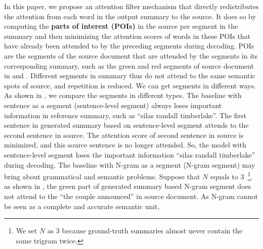 In this paper, we propose an attention filter mechanism that directly 
redistributes the attention from each word in the output summary to the source. 
It does so by computing the \textbf{parts of interest (POIs)} 
in the source per segment in the summary
and then minimizing the attention scores of
words in these POIs that have already been attended to by the preceding 
segments during decoding. 
POIs are the segments of the source document that are attended by the segments in its corresponding summary, 
such as the green and red segments of source document in  and .
Different segments in summary thus do not attend to the same semantic spots
of source, and repetition is reduced. 
We can get segments in different ways.
As shown in , we compare the segments in different types.
The baseline with sentence as a segment (sentence-level segment) 
always loses important information in reference summary, such as ``silas randall timberlake''.
The first sentence in generated summary based on sentence-level segment attends to 
the second sentence in source. 
The attention score of second sentence in source is minimized,
and this source sentence is no longer attended. 
So, the model with sentence-level segment loses the important information ``silas randall timberlake''
during decoding.
The baseline with N-gram as a segment (N-gram segment) may bring about grammatical and semantic problems.
Suppose that $N$ equals to 3~\footnote{We set $N$ as 3 because ground-truth summaries almost never contain the same trigram twice.}, 
as shown in ,
the green part of generated summary based N-gram segment does not attend to the ``the couple announced''
in source document. 
As N-gram cannot be seen as a complete and accurate semantic unit,
